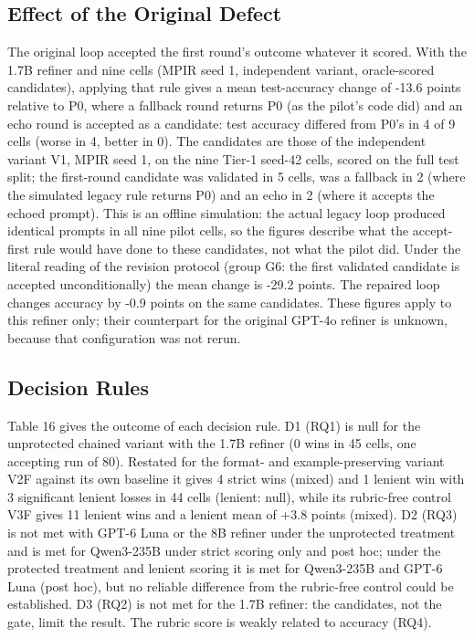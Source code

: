 \documentclass{ieeeaccess}
\begin{document}
\subsection{Effect of the Original Defect}

The original loop accepted the first round's outcome whatever it scored. With the 1.7B refiner and nine cells (MPIR seed 1, independent variant, oracle-scored candidates), applying that rule gives a mean test-accuracy change of -13.6 points relative to P0, where a fallback round returns P0 (as the pilot's code did) and an echo round is accepted as a candidate: test accuracy differed from P0's in 4 of 9 cells (worse in 4, better in 0). The candidates are those of the independent variant V1, MPIR seed 1, on the nine Tier-1 seed-42 cells, scored on the full test split; the first-round candidate was validated in 5 cells, was a fallback in 2 (where the simulated legacy rule returns P0) and an echo in 2 (where it accepts the echoed prompt). This is an offline simulation: the actual legacy loop produced identical prompts in all nine pilot cells, so the figures describe what the accept-first rule would have done to these candidates, not what the pilot did. Under the literal reading of the revision protocol (group G6: the first validated candidate is accepted unconditionally) the mean change is -29.2 points. The repaired loop changes accuracy by -0.9 points on the same candidates. These figures apply to this refiner only; their counterpart for the original GPT-4o refiner is unknown, because that configuration was not rerun.

\subsection{Decision Rules}

Table 16 gives the outcome of each decision rule. D1 (RQ1) is null for the unprotected chained variant with the 1.7B refiner (0 wins in 45 cells, one accepting run of 80). Restated for the format- and example-preserving variant V2F against its own baseline it gives 4 strict wins (mixed) and 1 lenient win with 3 significant lenient losses in 44 cells (lenient: null), while its rubric-free control V3F gives 11 lenient wins and a lenient mean of +3.8 points (mixed). D2 (RQ3) is not met with GPT-6 Luna or the 8B refiner under the unprotected treatment and is met for Qwen3-235B under strict scoring only and post hoc; under the protected treatment and lenient scoring it is met for Qwen3-235B and GPT-6 Luna (post hoc), but no reliable difference from the rubric-free control could be established. D3 (RQ2) is not met for the 1.7B refiner: the candidates, not the gate, limit the result. The rubric score is weakly related to accuracy (RQ4).
\end{document}
